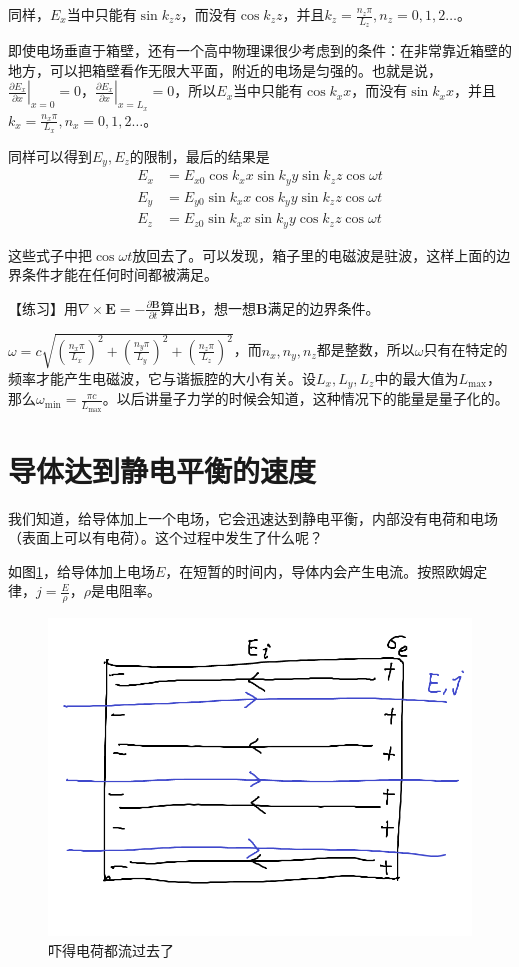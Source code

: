 同样，$E_x$当中只能有$\sin k_z z$，而没有$\cos k_z z$，并且$k_z=\frac{n_z \pi}{L_z}, n_z=0,1,2 \dots$。

即使电场垂直于箱壁，还有一个高中物理课很少考虑到的条件：在非常靠近箱壁的地方，可以把箱壁看作无限大平面，附近的电场是匀强的。也就是说，$\left. \frac{\partial E_x}{\partial x} \right|_{x=0}=0$，$\left. \frac{\partial E_x}{\partial x} \right|_{x=L_x}=0$，所以$E_x$当中只能有$\cos k_x x$，而没有$\sin k_x x$，并且$k_x=\frac{n_x \pi}{L_x}, n_x=0,1,2 \dots$。

同样可以得到$E_y,E_z$的限制，最后的结果是
\begin{align*}
E_x&=E_{x 0} \cos k_x x \sin k_y y \sin k_z z \cos \omega t \\
E_y&=E_{y 0} \sin k_x x \cos k_y y \sin k_z z \cos \omega t \\
E_z&=E_{z 0} \sin k_x x \sin k_y y \cos k_z z \cos \omega t
\end{align*}

这些式子中把$\cos \omega t$放回去了。可以发现，箱子里的电磁波是驻波，这样上面的边界条件才能在任何时间都被满足。

【练习】用$\nabla \times \mathbf{E}=-\frac{\partial \mathbf{B}}{\partial t}$算出$\mathbf{B}$，想一想$\mathbf{B}$满足的边界条件。

$\omega=c \sqrt{(\frac{n_x \pi}{L_x})^2+(\frac{n_y \pi}{L_y})^2+(\frac{n_z \pi}{L_z})^2}$，而$n_x,n_y,n_z$都是整数，所以$\omega$只有在特定的频率才能产生电磁波，它与谐振腔的大小有关。设$L_x,L_y,L_z$中的最大值为$L_\text{max}$，那么$\omega_\text{min}=\frac{\pi c}{L_\text{max}}$。以后讲量子力学的时候会知道，这种情况下的能量是量子化的。
\section{导体达到静电平衡的速度}
我们知道，给导体加上一个电场，它会迅速达到静电平衡，内部没有电荷和电场（表面上可以有电荷）。这个过程中发生了什么呢？

如图\ref{fig-elec-equi}，给导体加上电场$E$，在短暂的时间内，导体内会产生电流。按照欧姆定律，$j=\frac{E}{\rho}$，$\rho$是电阻率。
\begin{figure}[htb]
\centering
\includegraphics[width=0.33\linewidth]{fig/elec-equi.png}
\caption{吓得电荷都流过去了}
\label{fig-elec-equi}
\end{figure}

